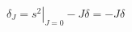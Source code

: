 \begin{equation}  \label{dudal1}
\delta_{J}=\left.s^{2}\right|_{J=0}-J\delta=-J\delta
\end{equation}

